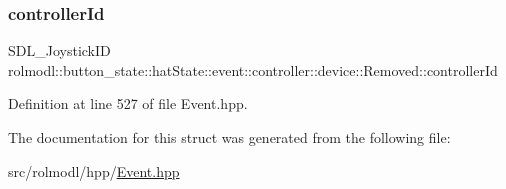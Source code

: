 \subsubsection{\texorpdfstring{controllerId}{controllerId}}
{\footnotesize\ttfamily S\+D\+L\+\_\+\+Joystick\+ID rolmodl\+::button\+\_\+state\+::hat\+State\+::event\+::controller\+::device\+::\+Removed\+::controller\+Id}



Definition at line 527 of file Event.\+hpp.



The documentation for this struct was generated from the following file\+:\begin{DoxyCompactItemize}
\item 
src/rolmodl/hpp/\mbox{\hyperlink{_event_8hpp}{Event.\+hpp}}\end{DoxyCompactItemize}
